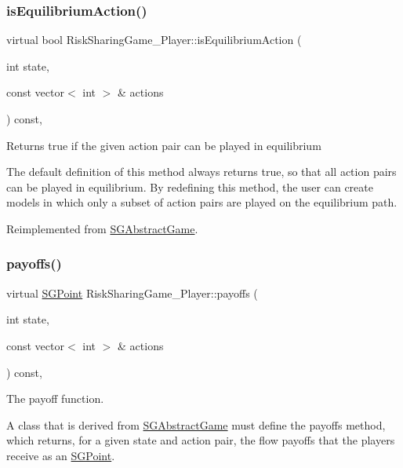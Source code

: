 \subsubsection{\texorpdfstring{is\+Equilibrium\+Action()}{isEquilibriumAction()}}
{\footnotesize\ttfamily virtual bool Risk\+Sharing\+Game\+\_\+Player\+::is\+Equilibrium\+Action (\begin{DoxyParamCaption}\item[{int}]{state,  }\item[{const vector$<$ int $>$ \&}]{actions }\end{DoxyParamCaption}) const\hspace{0.3cm}{\ttfamily [inline]}, {\ttfamily [virtual]}}

Returns true if the given action pair can be played in equilibrium

The default definition of this method always returns true, so that all action pairs can be played in equilibrium. By redefining this method, the user can create models in which only a subset of action pairs are played on the equilibrium path. 

Reimplemented from \hyperlink{classSGAbstractGame_a2cec8147c3055cfe6314da349d1a7344}{S\+G\+Abstract\+Game}.

\mbox{\label{classRiskSharingGame__3Player_ae4a07f7dc66f18eccd29bc7993c0472f}} 
\subsubsection{\texorpdfstring{payoffs()}{payoffs()}}
{\footnotesize\ttfamily virtual \hyperlink{classSGPoint}{S\+G\+Point} Risk\+Sharing\+Game\+\_\+Player\+::payoffs (\begin{DoxyParamCaption}\item[{int}]{state,  }\item[{const vector$<$ int $>$ \&}]{actions }\end{DoxyParamCaption}) const\hspace{0.3cm}{\ttfamily [inline]}, {\ttfamily [virtual]}}



The payoff function. 

A class that is derived from \hyperlink{classSGAbstractGame}{S\+G\+Abstract\+Game} must define the payoffs method, which returns, for a given state and action pair, the flow payoffs that the players receive as an \hyperlink{classSGPoint}{S\+G\+Point}. 

